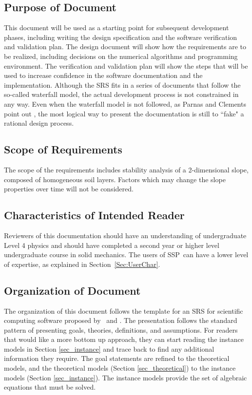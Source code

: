 \documentclass[12pt]{article}
\newcommand{\progname}{SSP}
\begin{document}
\subsection{Purpose of Document}

This document will be used as a starting point for subsequent development 
phases, including writing the design specification and the software verification
 and validation plan. The design document will show how the requirements
 are to be realized, including decisions on the numerical algorithms and 
programming environment. The verification and validation plan will show
 the steps that will be used to increase confidence in the software 
 documentation
 and the implementation. Although the SRS fits in a series of documents 
that follow the so-called waterfall model, the actual development process
 is not constrained in any way. Even when the waterfall model is not followed, 
as Parnas and Clements point out \cite{ParnasAndClements1986}, the most logical 
way to present the documentation is still to ``fake" a rational design process.

\subsection{Scope of Requirements} 

The scope of the requirements includes stability analysis of a 2-dimensional 
slope, composed of homogeneous soil layers. Factors which may change the slope 
properties over time will not be considered.

\subsection{Characteristics of Intended Reader}
\label{Sec:CharofInteRead}
Reviewers of this documentation should have an understanding of undergraduate 
Level 4 physics and should have completed a second year or higher level 
undergraduate course in solid mechanics. The users of \progname\ can have a 
lower level of expertise, as explained in Section~\ref{Sec:UserChar}.

\subsection{Organization of Document}

The organization of this document follows the template for an SRS for
scientific computing software proposed by~\cite{Koothoor2013} and
\cite{SmithAndLai2005}.  The presentation follows the standard pattern
of presenting goals, theories, definitions, and assumptions.  For
readers that would like a more bottom up approach, they can start
reading the instance models in Section \ref{sec_instance} and trace
back to find any additional information they require. The goal statements 
are refined to the theoretical models, and the theoretical models (Section 
\ref{sec_theoretical}) to the instance models (Section \ref{sec_instance}). The 
instance models provide the set of algebraic equations that must be solved.
\end{document}
